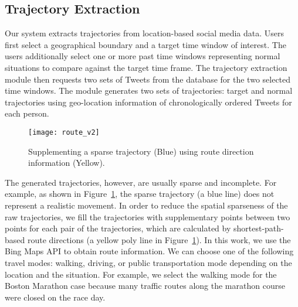 \subsection{Trajectory Extraction}
\label{sec:trajectory_extraction}

Our system extracts trajectories from location-based social media data.
Users first select a geographical boundary and a target time window of interest.
The users additionally select one or more past time windows representing normal situations to compare against the target time frame.
The trajectory extraction module then requests two sets of Tweets from the database for the two selected time windows.
The module generates two sets of trajectories: target and normal trajectories using geo-location information of chronologically ordered Tweets for each person.

\begin{figure}[tbh]
	\centering
	\texttt{[image: route\_v2]}
	\caption{Supplementing a sparse trajectory (Blue) using route direction information (Yellow). }
	\label{fig:route}
\end{figure}

The generated trajectories, however, are usually sparse and incomplete.
For example, as shown in Figure~\ref{fig:route}, the sparse trajectory (a blue line) does not represent a realistic movement.
In order to reduce the spatial sparseness of the raw trajectories, 
we fill the trajectories with supplementary points between two points for each pair of the trajectories, which are calculated by shortest-path-based route directions (a yellow poly line in Figure~\ref{fig:route}).
In this work, we use the Bing Maps API to obtain route information.
We can choose one of the following travel modes: walking, driving, or public transportation mode depending on the location and the situation.
For example, we select the walking mode for the Boston Marathon case because many traffic routes along the marathon course were closed on the race day.

